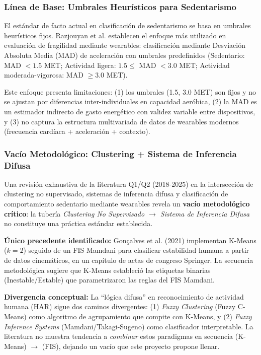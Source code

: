 \subsubsection{Línea de Base: Umbrales Heurísticos para Sedentarismo}
\label{subsubsec:linea_base_umbrales}

El estándar de facto actual en clasificación de sedentarismo se basa en umbrales heurísticos fijos. Razjouyan et al. \citep{Razjouyan2018Frailty} establecen el enfoque más utilizado en evaluación de fragilidad mediante wearables: clasificación mediante Desviación Absoluta Media (MAD) de aceleración con umbrales predefinidos (Sedentario: MAD $< 1.5$ MET; Actividad ligera: $1.5 \leq$ MAD $< 3.0$ MET; Actividad moderada-vigorosa: MAD $\geq 3.0$ MET).

Este enfoque presenta limitaciones: (1) los umbrales (1.5, 3.0 MET) son fijos y no se ajustan por diferencias inter-individuales en capacidad aeróbica, (2) la MAD es un estimador indirecto de gasto energético con validez variable entre dispositivos, y (3) no captura la estructura multivariada de datos de wearables modernos (frecuencia cardíaca + aceleración + contexto).

\subsubsection{Vacío Metodológico: Clustering + Sistema de Inferencia Difusa}
\label{subsubsec:vacio_clustering_fuzzy}

Una revisión exhaustiva de la literatura Q1/Q2 (2018-2025) en la intersección de clustering no supervisado, sistemas de inferencia difusa y clasificación de comportamiento sedentario mediante wearables revela un \textbf{vacío metodológico crítico}: la tubería \textit{Clustering No Supervisado $\rightarrow$ Sistema de Inferencia Difusa} no constituye una práctica estándar establecida.

\textbf{Único precedente identificado:} Gonçalves et al. (2021) implementan K-Means ($k=2$) seguido de un FIS Mamdani para clasificar estabilidad humana a partir de datos cinemáticos, en un capítulo de actas de congreso Springer. La secuencia metodológica sugiere que K-Means estableció las etiquetas binarias (Inestable/Estable) que parametrizaron las reglas del FIS Mamdani.

\textbf{Divergencia conceptual:} La ``lógica difusa'' en reconocimiento de actividad humana (HAR) sigue dos caminos divergentes: (1) \textit{Fuzzy Clustering} (Fuzzy C-Means) como algoritmo de agrupamiento que compite con K-Means, y (2) \textit{Fuzzy Inference Systems} (Mamdani/Takagi-Sugeno) como clasificador interpretable. La literatura no muestra tendencia a \textit{combinar} estos paradigmas en secuencia (K-Means) $\rightarrow$ (FIS), dejando un vacío que este proyecto propone llenar.

